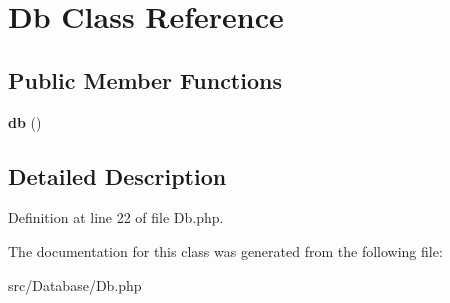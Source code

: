 \hypertarget{class_zest_1_1_database_1_1_db}{}\section{Db Class Reference}
\label{class_zest_1_1_database_1_1_db}
\subsection*{Public Member Functions}
\begin{DoxyCompactItemize}
\item 
\mbox{\label{class_zest_1_1_database_1_1_db_abf2dfcff06cad1e6c249ddc4df4d0866}} 
{\bfseries db} ()
\end{DoxyCompactItemize}


\subsection{Detailed Description}


Definition at line 22 of file Db.\+php.



The documentation for this class was generated from the following file\+:\begin{DoxyCompactItemize}
\item 
src/\+Database/Db.\+php\end{DoxyCompactItemize}

